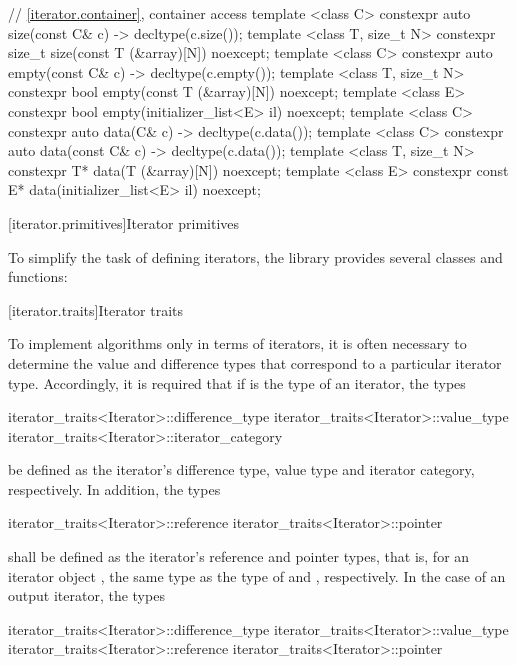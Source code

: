 \begin{codeblock}
{  // \ref{iterator.container}, container access
  template <class C> constexpr auto size(const C& c) -> decltype(c.size());
  template <class T, size_t N> constexpr size_t size(const T (&array)[N]) noexcept;
  template <class C> constexpr auto empty(const C& c) -> decltype(c.empty());
  template <class T, size_t N> constexpr bool empty(const T (&array)[N]) noexcept;
  template <class E> constexpr bool empty(initializer_list<E> il) noexcept;
  template <class C> constexpr auto data(C& c) -> decltype(c.data());
  template <class C> constexpr auto data(const C& c) -> decltype(c.data());
  template <class T, size_t N> constexpr T* data(T (&array)[N]) noexcept;
  template <class E> constexpr const E* data(initializer_list<E> il) noexcept;
}
\end{codeblock}

[iterator.primitives]{Iterator primitives}

\pnum
To simplify the task of defining iterators, the library provides
several classes and functions:

[iterator.traits]{Iterator traits}

\pnum
{}%
To implement algorithms only in terms of iterators, it is often necessary to
determine the value and
difference types that correspond to a particular iterator type.
Accordingly, it is required that if
is the type of an iterator,
the types

\begin{codeblock}
iterator_traits<Iterator>::difference_type
iterator_traits<Iterator>::value_type
iterator_traits<Iterator>::iterator_category
\end{codeblock}

be defined as the iterator's difference type, value type and iterator category, respectively.
In addition, the types

\begin{codeblock}
iterator_traits<Iterator>::reference
iterator_traits<Iterator>::pointer
\end{codeblock}

shall be defined as the iterator's reference and pointer types, that is, for an
iterator object , the same type as the type of  and ,
respectively. In the case of an output iterator, the types

\begin{codeblock}
iterator_traits<Iterator>::difference_type
iterator_traits<Iterator>::value_type
iterator_traits<Iterator>::reference
iterator_traits<Iterator>::pointer
\end{codeblock}

